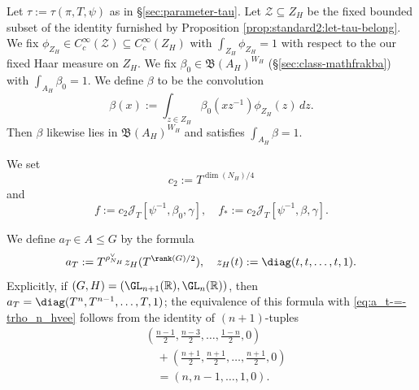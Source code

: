 Let $\tau := \tau(\pi,T,\psi)$ as in \S\ref{sec:parameter-tau}.  Let $\mathcal{Z} \subseteq Z_H$ be the fixed bounded subset of the identity furnished by Proposition \ref{prop:standard2:let-tau-belong}.  We fix $\phi_{Z_H} \in C_c^\infty(\mathcal{Z}) \subseteq C_c^\infty(Z_H)$ with $\int_{Z_H} \phi_{Z_H} = 1$ with respect to the our fixed Haar measure on $Z_H$.  We fix $\beta_0 \in \mathfrak{B}(A_H)^{W_H}$ (\S\ref{sec:class-mathfrakba}) with $\int_{A_H} \beta_0 = 1$.  We define $\beta$ to be the convolution
\begin{equation}\label{eq:hx-:=-int}
  \beta (x) := \int_{z \in Z_H} \beta_0(x z^{-1}) \phi_{Z_H}(z) \, d z.
\end{equation}
Then $\beta$ likewise lies in $\mathfrak{B}(A_H)^{W_H}$ and satisfies $\int_{A_H} \beta = 1$.

We set
\begin{equation*}
  c_2 := T^{\dim(N_H)/4}
\end{equation*}
and
\begin{equation*}
  f := c_2 \mathcal{J}_T[\psi^{-1},\beta_0,\gamma],
  \quad
  f_{\ast} := c_2 \mathcal{J}_T[\psi^{-1},\beta,\gamma].
\end{equation*}


We define $a_T \in A \leq G$ by the formula
\begin{equation}\label{eq:a_t-=-trho_n_hvee}
  a_T := T^{\rho_{N_H}^\vee} z_H(T^{\rank(G)/2}),
  \quad
  z_H(t) := \diag(t,t,\dotsc,t,1).
\end{equation}
Explicitly, if $(G,H) = (\GL_{n+1}(\mathbb{R}), \GL_n(\mathbb{R}))$, then
$a_T = \diag(T^{n}, T^{n-1}, \dotsc, T, 1)$; the equivalence of this formula with \eqref{eq:a_t-=-trho_n_hvee} follows from the identity of $(n+1)$-tuples
\begin{align*}
  &\left( \frac{n-1}{2},
    \frac{n-3}{2},
    \dotsc,
    \frac{1-n}{2}, 0
    \right) \\
  &\quad +
    \left( \frac{n + 1}{2}, \frac{n + 1}{2}, \dotsc,
    \frac{n + 1}{2}, 0\right)
  \\
  &\quad =
    \left( n, n - 1, \dotsc, 1, 0 \right).
\end{align*}

